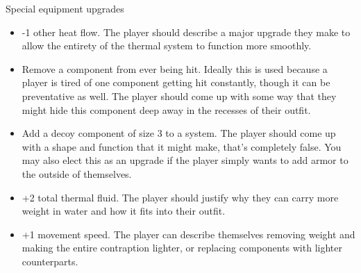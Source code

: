 \documentclass[a4paper]{article}
\begin{document}
Special equipment upgrades

\begin{itemize}
\item -1 other heat flow. The player should describe a major upgrade they make to allow the entirety of the thermal system to function more smoothly.
\item Remove a component from ever being hit. Ideally this is used because a player is tired of one component getting hit constantly, though it can be preventative as well. The player should come up with some way that they might hide this component deep away in the recesses of their outfit.
\item Add a decoy component of size 3 to a system. The player should come up with a shape and function that it might make, that's completely false. You may also elect this as an upgrade if the player simply wants to add armor to the outside of themselves.
\item +2 total thermal fluid. The player should justify why they can carry more weight in water and how it fits into their outfit. 
\item +1 movement speed. The player can describe themselves removing weight and making the entire contraption lighter, or replacing components with lighter counterparts. 
\end{itemize}
\end{document}
